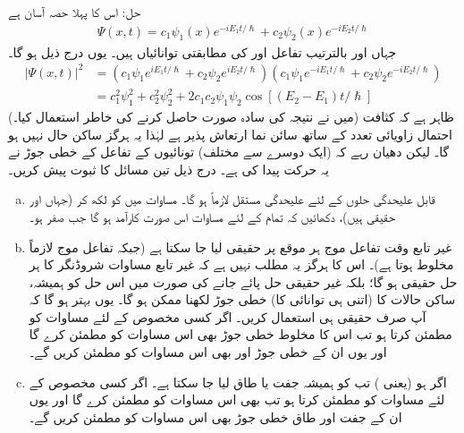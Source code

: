 حل:\quad
اس کا پہلا حصہ آسان ہے
\begin{align*}
\Psi (x,t) = c_{1} \psi_{1}(x)e^{-iE_{1}t/\hslash} + c_{2} \psi_{2}(x)e^{-iE_{2}t/\hslash}
\end{align*}
جہاں   اور  بالترتیب تفاعل  اور  کی مطابقتی توانائیاں ہیں۔ یوں   درج ذیل ہو گا۔ 
\begin{align*}
\left| \Psi (x,t) \right|^{2} &= \left( c_{1} \psi_{1} e^{iE_{1}t/\hslash} + c_{2} \psi_{2} e^{iE_{2}t/\hslash} \right) \left( c_{1} \psi_{1} e^{-iE_{1}t/\hslash} + c_{2} \psi_{2} e^{-iE_{2}t/\hslash} \right) \\
&= c_{1}^{2} \psi_{1}^{2} + c_{2}^{2} \psi_{2}^{2} + 2c_{1}c_{2}\psi_{1}\psi_{2} \cos [ ( E_{2} - E_{1})t/\hslash]
\end{align*}
(میں نے نتیجہ کی سادہ صورت حاصل کرنے کی خاطر   استعمال کیا۔)  ظاہر ہے کہ   کثافت احتمال زاویائی
 تعدد  کے ساتھ  سائن نما ارتعاش پذیر ہے لہٰذا یہ ہرگز ساکن حال نہیں ہو گا۔ لیکن دھیان رہے کہ (ایک دوسرے سے مختلف) تونائیوں کے تفاعل کے خطی جوڑ نے یہ حرکت پیدا کی ہے۔ 
درج ذیل تین مسائل کا ثبوت پیش کریں۔
\begin{enumerate}[a.]
\item
قابل علیحدگی حلوں کے لئے علیحدگی مستقل  لازماً  ہو گا۔  مساوات  میں  کو  لکھ کر (جہاں  اور  حقیقی ہیں)، دکھائیں کہ تمام  کے لئے مساوات  اس صورت کارآمد ہو گا جب  صفر ہو۔ 
\item
غیر تابع وقت تفاعل موج  ہر موقع پر حقیقی لیا جا سکتا ہے (جبکہ تفاعل موج  لازماً مخلوط ہوتا ہے)۔ اس کا ہرگز یہ مطلب نہیں ہے کہ غیر تابع مساوات شروڈنگر کا ہر حل حقیقی ہو گا؛ بلکہ غیر حقیقی حل پائے جانے کی صورت میں اس حل کو ہمیشہ، ساکن حالات کا (اتنی ہی توانائی کا) خطی جوڑ لکھنا ممکن ہو گا۔ یوں بہتر ہو گا کہ آپ صرف حقیقی  ہی استعمال کریں۔  اگر کسی مخصوص  کے لئے  مساوات  کو مطمئن کرتا ہو تب اس کا مخلوط خطی جوڑ بھی اس مساوات کو مطمئن کرے گا اور یوں ان کے خطی جوڑ  اور  بھی اس مساوات کو مطمئن کریں گے۔
\item
اگر   ہو (یعنی  )   تب  کو ہمیشہ جفت یا طاق لیا جا  سکتا ہے۔  اگر کسی مخصوص  کے لئے  مساوات  کو مطمئن کرتا ہو تب  بھی اس مساوات کو مطمئن کرے گا اور یوں ان کے جفت اور طاق خطی جوڑ  بھی اس مساوات کو مطمئن کریں گے۔ 
\end{enumerate}
